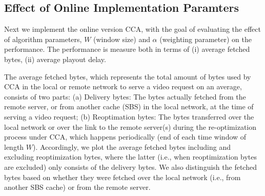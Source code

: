 \documentclass[conference]{IEEEtran}
\begin{document}




\subsection{Effect of Online Implementation Paramters}

Next we implement the online version CCA, with the goal of evaluating the effect of algorithm parameters, $W$ (window size) and $\alpha$ (weighting parameter) on the performance. The performance is measure both in terms of (i) average fetched bytes, (ii) average playout delay. 

The average fetched bytes, which represents the total amount of bytes used by CCA in the local or remote network to serve a video request on an average, consists of two parts: (a) Delivery bytes: The bytes actually fetched from the remote server, or from another cache (SBS) in the local network, at the time of serving a video request; (b) Reoptimation bytes: The bytes transferred over the local network or over the link to the remote server(s) during the re-optimization process under CCA, which happens periodically (end of each time window of length $W$). Accordingly, we plot the average fetched bytes including and excluding reoptimization bytes, where the latter (i.e., when reoptimization bytes are excluded) only consists of the delivery bytes. We also distinguish the fetched bytes based on whether they were fetched over the local network (i.e., from another SBS cache) or from the remote server. 

\end{document}
